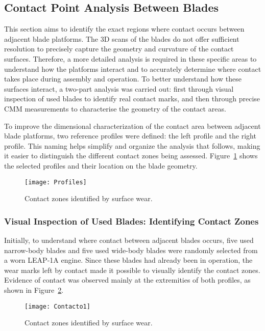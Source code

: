 \subsection{Contact Point Analysis Between Blades}
\label{cha:contacto}
This section aims to identify the exact regions where contact occurs between adjacent blade platforms. The 3D scans of the blades do not offer sufficient resolution to precisely capture the geometry and curvature of the contact surfaces. Therefore, a more detailed analysis is required in these specific areas to understand how the platforms interact and to accurately determine where contact takes place during assembly and operation.
To better understand how these surfaces interact, a two-part analysis was carried out: first through visual inspection of used blades to identify real contact marks, and then through precise CMM measurements to characterise the geometry of the contact areas.

To improve the dimensional characterization of the contact area between adjacent blade platforms, two reference profiles were defined: the left profile and the right profile. This naming helps simplify and organize the analysis that follows, making it easier to distinguish the different contact zones being assessed. Figure~\ref{fig:profiles} shows the selected profiles and their location on the blade geometry.

\begin{figure}[H]
    \centering
    \texttt{[image: Profiles]}
    \caption{Contact zones identified by surface wear.}
    \label{fig:profiles}
\end{figure}


\subsubsection{Visual Inspection of Used Blades: Identifying Contact Zones}
\label{cha:iv}

Initially, to understand where contact between adjacent blades occurs, five used narrow-body blades and five used wide-body blades were randomly selected from a worn LEAP-1A engine. Since these blades had already been in operation, the wear marks left by contact made it possible to visually identify the contact zones. Evidence of contact was observed mainly at the extremities of both profiles, as shown in Figure~\ref{fig:contacto1}.

\begin{figure}[H]
    \centering
    \texttt{[image: Contacto1]}
    \caption{Contact zones identified by surface wear.}
    \label{fig:contacto1}
\end{figure}

